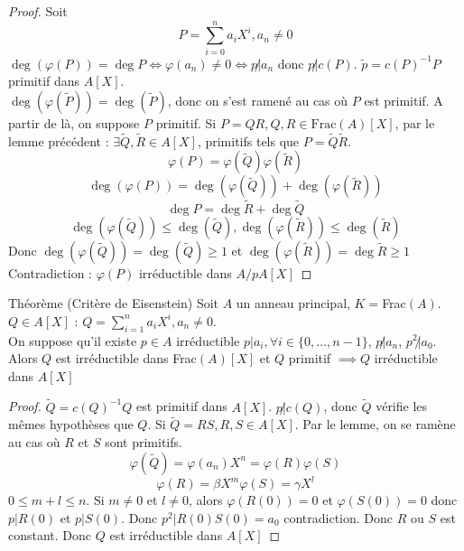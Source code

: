 \documentclass[]{report}
\begin{document}
    \begin{proof}
        Soit
        \[P=\sum_{i=0}^{n}a_i X^i,a_n\neq0\]
        $\deg(\varphi(P))=\deg P\iff\varphi(a_n)\neq0\iff p\not| a_n$ donc $p\not|c(P)$. $\widetilde{p}=c(P)^{-1}P$ primitif dans $A[X]$.\\
        $\deg(\varphi(\widetilde{P}))=\deg(\widetilde{P})$, donc on s'est ramené au cas où $P$ est primitif. A partir de là, on suppose $P$ primitif. Si $P=QR,Q,R\in\text{Frac}(A)[X]$, par le lemme précédent : $\exists \widetilde{Q},\widetilde{R}\in A[X]$, primitifs tels que $P=\widetilde{Q}\widetilde{R}$.
        \[\varphi(P)=\varphi(\widetilde{Q})\varphi(\widetilde{R})\]
        \[\deg (\varphi(P))=\deg(\varphi(\widetilde{Q}))+\deg (\varphi(\widetilde{R}))\]
        \[\deg P=\deg \widetilde{R}+\deg \widetilde{Q}\]
        \[\deg(\varphi(\widetilde{Q}))\le \deg(\widetilde{Q}),\deg(\varphi(\widetilde{R}))\le\deg(\widetilde{R})\]
        Donc $\deg(\varphi (\widetilde{Q}))=\deg(\widetilde{Q})\ge 1$ et $\deg(\varphi(\widetilde{R}))=\deg\widetilde{R}\ge 1$\\
        Contradiction : $\varphi(P)$ irréductible dans $A/pA[X]$
    \end{proof}

    \begin{tm}{Théorème (Critère de Eisenstein)}{}
        Soit $A$ un anneau principal, $K=$Frac$(A)$.\\
        $Q\in A[X]$ : $\displaystyle{Q=\sum_{i=1}^n}a_iX^i,a_n\neq0$. \\
        On suppose qu'il existe $p\in A$ irréductible \tq $p|a_i,\forall i\in \{0,\dots,n-1\}$, $ p\not|a_n$, $p^2\not|a_0$. \\
        Alors $Q$ est irréductible dans Frac$(A)[X]$ et $Q$ primitif $\implies Q$ irréductible dans $A[X]$
    \end{tm}

    \begin{proof}
        $\widetilde{Q}=c(Q)^{-1}Q$ est primitif dans $A[X]$. $p\not| c(Q)$, donc $\widetilde{Q}$ vérifie les mêmes hypothèses que $Q$. Si $\widetilde{Q}=RS,R,S\in A[X]$. Par le lemme, on se ramène au cas où $R$ et $S$ sont primitifs.
        \[\varphi(\widetilde{Q})=\varphi(a_n)X^n=\varphi(R)\varphi(S)\]
        \[\varphi(R)=\beta X^m \varphi(S)=\gamma X^l\]
        $0\le m+l \le n$. Si $m\neq0$ et $l\neq0$, alors $\varphi(R(0))=0$ et $\varphi(S(0))=0$ donc $p|R(0)$ et $p|S(0)$. Donc $p^2|R(0)S(0)=a_0$ contradiction. Donc $R$ ou $S$ est constant. Donc $Q$ est irréductible dans $A[X]$
    \end{proof}
\end{document}
